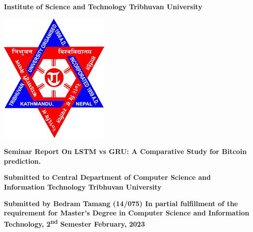 
\begin{center}
	\textbf{
		\Large
		Institute of Science and Technology
		\linebreak
		Tribhuvan University
	}
\end{center}

\vspace{1.5cm}

\begin{center}
	\includegraphics[scale=0.4]{resources/logo.png}
\end{center}

\vspace{1.5cm}

\begin{center}
	\textbf{
		\large
		Seminar Report 
		\linebreak
		On
		\linebreak
		LSTM vs GRU: A Comparative Study for Bitcoin prediction.
	}
\end{center}

\vspace{1.5cm}

\begin{center}
	\textbf{
		\large
		Submitted to 
		\linebreak
		Central Department of Computer Science and Information Technology
		\linebreak
		Tribhuvan University
	}
\end{center}

\vspace{1.5cm}

\begin{center}
	\textbf{
		\large
		Submitted by
		\linebreak
		Bedram Tamang (14/075)
		\linebreak
		In partial fulfillment of the requirement for Master's Degree in Computer Science and Information Technology, 2\textsuperscript{nd} Semester
		\linebreak
		February, 2023
	}
\end{center}

\clearpage